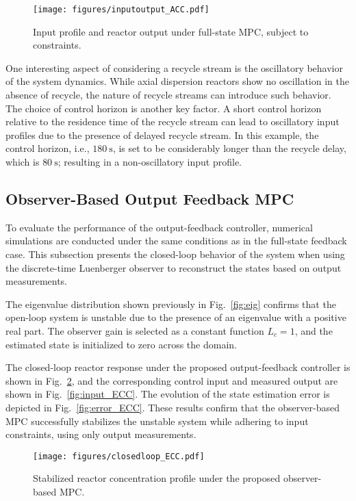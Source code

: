 \begin{figure}[htbp]
    \centering
    \texttt{[image: figures/inputoutput\_ACC.pdf]}
    \caption{Input profile and reactor output under full-state MPC, subject to constraints.}
    \label{fig:input_ACC}
\end{figure}

One interesting aspect of considering a recycle stream is the oscillatory behavior of the system dynamics. While axial dispersion reactors show no oscillation in the absence of recycle, the nature of recycle streams can introduce such behavior. The choice of control horizon is another key factor. A short control horizon relative to the residence time of the recycle stream can lead to oscillatory input profiles due to the presence of delayed recycle stream. In this example, the control horizon, i.e., $180~\mathrm{s}$, is set to be considerably longer than the recycle delay, which is $80~\mathrm{s}$; resulting in a non-oscillatory input profile.

\subsection{Observer-Based Output Feedback MPC}

To evaluate the performance of the output-feedback controller, numerical simulations are conducted under the same conditions as in the full-state feedback case. This subsection presents the closed-loop behavior of the system when using the discrete-time Luenberger observer to reconstruct the states based on output measurements.

The eigenvalue distribution shown previously in Fig.~\ref{fig:eig} confirms that the open-loop system is unstable due to the presence of an eigenvalue with a positive real part. The observer gain is selected as a constant function $L_c = 1$, and the estimated state is initialized to zero across the domain. %

The closed-loop reactor response under the proposed output-feedback controller is shown in Fig.~\ref{fig:closed_ECC}, and the corresponding control input and measured output are shown in Fig.~\ref{fig:input_ECC}. The evolution of the state estimation error is depicted in Fig.~\ref{fig:error_ECC}. These results confirm that the observer-based MPC successfully stabilizes the unstable system while adhering to input constraints, using only output measurements.

\begin{figure}[htbp]
    \centering
    \texttt{[image: figures/closedloop\_ECC.pdf]}
    \caption{Stabilized reactor concentration profile under the proposed observer-based MPC.}
    \label{fig:closed_ECC}
\end{figure}

